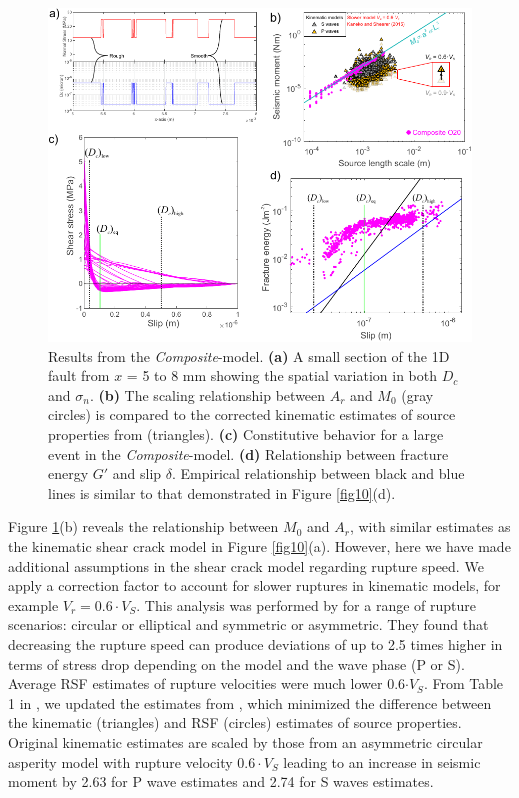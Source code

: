 \documentclass[preprint,1p, 10pt,authoryear]{elsarticle}
\begin{document}
\begin{figure}
	\centering
	\includegraphics{FIG12_revised.pdf} 
	\caption{Results from the \textit{Composite}-model. \textbf{(a)} A small section of the 1D fault from $x$ = 5 to 8 mm showing the spatial variation in both $D_{c}$ and $\sigma_{n}$. \textbf{(b)} The scaling relationship between $A_{r}$ and $M_{0}$ (gray circles) is compared to the corrected kinematic estimates of source properties from \citet{Selvadurai2019} (triangles).   \textbf{(c)} Constitutive behavior for a large event in the \textit{Composite}-model. \textbf{(d)} Relationship between fracture energy $G'$ and slip $\delta$. Empirical relationship between black and blue lines is similar to that demonstrated in Figure \ref{fig10}(d).}
	\label{fig12}
\end{figure}

Figure \ref{fig12}(b) reveals the relationship between $M_{0}$ and $A_{r}$, with similar estimates as the kinematic shear crack model in Figure \ref{fig10}(a). However, here we have made additional assumptions in the shear crack model regarding rupture speed.  We apply a correction factor to account for slower ruptures in kinematic models, for example $V_{r} = 0.6\cdot V_{S}$.  This analysis was performed by \citet{Kaneko2015} for a range of rupture scenarios: circular or elliptical and symmetric or asymmetric.  They found that decreasing the rupture speed can produce deviations of up to 2.5 times higher in terms of stress drop depending on the model and the wave phase (P or S).  Average RSF estimates of rupture velocities were much lower 0.6$\cdot V_{S}$.  From Table 1 in \citet{Kaneko2015}, we updated the estimates from \citet{Selvadurai2019}, which minimized the difference between the kinematic (triangles) and RSF (circles) estimates of source properties.  Original kinematic estimates are scaled by those from an asymmetric circular asperity model with rupture velocity $0.6\cdot V_{S}$ leading to an increase in seismic moment by 2.63 for P wave estimates and 2.74 for S waves estimates.
\end{document}
